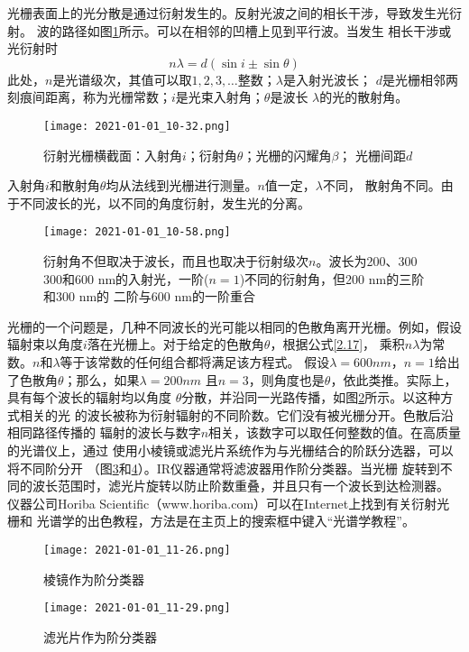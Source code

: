 光栅表面上的光分散是通过衍射发生的。反射光波之间的相长干涉，导致发生光衍射。
波的路径如图\ref{fig:2.20}所示。可以在相邻的凹槽上见到平行波。当发生
相长干涉或光衍射时
\begin{equation}
    n\lambda = d\left(\sin i \pm \sin\theta\right)
    \label{2.17}
\end{equation}
此处，$n$是光谱级次，其值可以取$1, 2, 3, \dots$整数；$\lambda$是入射光波长；
$d$是光栅相邻两刻痕间距离，称为光栅常数；$i$是光束入射角；$\theta$是波长
$\lambda$的光的散射角。
\begin{figure}[htpb]
    \centering
    \texttt{[image: 2021-01-01\_10-32.png]}
    \caption{衍射光栅横截面：入射角$i$；衍射角$\theta$；光栅的闪耀角$\beta$；
    光栅间距$d$}
    \label{fig:2.20}
\end{figure}
入射角$i$和散射角$\theta$均从法线到光栅进行测量。$n$值一定，$\lambda$不同，
散射角不同。由于不同波长的光，以不同的角度衍射，发生光的分离。
\begin{figure}[htpb]
    \centering
    \texttt{[image: 2021-01-01\_10-58.png]}
    \caption{衍射角不但取决于波长，而且也取决于衍射级次$n$。波长为200、300
    300和600 nm的入射光，一阶($n=1$)不同的衍射角，但200 nm的三阶和300 nm的
二阶与600 nm的一阶重合}
\label{fig:2.21}
\end{figure}

光栅的一个问题是，几种不同波长的光可能以相同的色散角离开光栅。例如，假设
辐射束以角度$i$落在光栅上。对于给定的色散角$\theta$，根据公式\ref{2.17}，
乘积$n\lambda$为常数。$n$和$\lambda$等于该常数的任何组合都将满足该方程式。
假设$\lambda = 600 nm$，$n = 1$给出了色散角$\theta$；那么，如果$\lambda=200 nm$
且$n = 3$，则角度也是$\theta$，依此类推。实际上，具有每个波长的辐射均以角度
$\theta$分散，并沿同一光路传播，如图\ref{fig:2.21}所示。以这种方式相关的光
的波长被称为衍射辐射的不同阶数。它们没有被光栅分开。色散后沿相同路径传播的
辐射的波长与数字$n$相关，该数字可以取任何整数的值。在高质量的光谱仪上，通过
使用小棱镜或滤光片系统作为与光栅结合的阶跃分选器，可以将不同阶分开
（图\ref{fig:2.22}和\ref{fig:2.23}）。IR仪器通常将滤波器用作阶分类器。当光栅
旋转到不同的波长范围时，滤光片旋转以防止阶数重叠，并且只有一个波长到达检测器。
仪器公司Horiba Scientific（www.horiba.com）可以在Internet上找到有关衍射光栅和
光谱学的出色教程，方法是在主页上的搜索框中键入“光谱学教程”。
\begin{figure}[htpb]
    \centering
    \texttt{[image: 2021-01-01\_11-26.png]}
    \caption{棱镜作为阶分类器}
    \label{fig:2.22}
\end{figure}
\begin{figure}[htpb]
    \centering
    \texttt{[image: 2021-01-01\_11-29.png]}
    \caption{滤光片作为阶分类器}
    \label{fig:2.23}
\end{figure}
